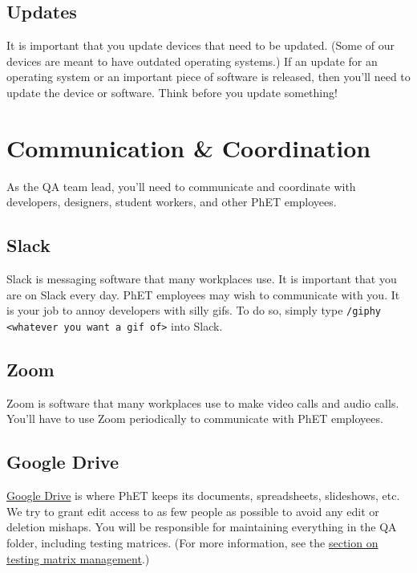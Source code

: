 \documentclass[titlepage]{article}
\begin{document}
	\subsection{Updates}

It is important that you update devices that need to be updated. (Some of our devices are meant to have outdated operating systems.) If an update for an operating system or an important piece of software is released, then you'll need to update the device or software. Think before you update something!

\pagebreak


\section{Communication \& Coordination}

As the QA team lead, you'll need to communicate and coordinate with developers, designers, student workers, and other PhET employees.

	\subsection{Slack}

Slack is messaging software that many workplaces use. It is important that you are on Slack every day. PhET employees may wish to communicate with you. It is your job to annoy developers with silly gifs. To do so, simply type \verb|/giphy <whatever you want a gif of>| into Slack.

	\subsection{Zoom}

Zoom is software that many workplaces use to make video calls and audio calls. You'll have to use Zoom periodically to communicate with PhET employees.

	\subsection{Google Drive}

\href{https://www.google.com/drive/}{Google Drive} is where PhET keeps its documents, spreadsheets, slideshows, etc. We try to grant edit access to as few people as possible to avoid any edit or deletion mishaps. You will be responsible for maintaining everything in the QA folder, including testing matrices. (For more information, see the \hyperref[subsec:matrix]{section on testing matrix management}.)
\end{document}
